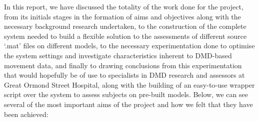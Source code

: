\documentclass[12pt,twoside]{report}
\begin{document}
\quad In this report, we have discussed the totality of the work done for the project, from its initials stages in the formation of aims and objectives along with the necessary background research undertaken, to the construction of the complete system needed to build a flexible solution to the assessments of different source ‘.mat’ files on different models, to the necessary experimentation done to optimise the system settings and investigate characteristics inherent to DMD-based movement data, and finally to drawing conclusions from this experimentation that would hopefully be of use to specialists in DMD research and assessors at Great Ormond Street Hospital, along with the building of an easy-to-use wrapper script over the system to assess subjects on pre-built models. Below, we can see several of the most important aims of the project and how we felt that they have been achieved:
\end{document}
